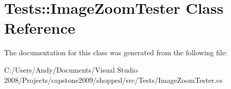 \hypertarget{class_tests_1_1_image_zoom_tester}{
\section{Tests::ImageZoomTester Class Reference}
\label{class_tests_1_1_image_zoom_tester}
}


The documentation for this class was generated from the following file:\begin{DoxyCompactItemize}
\item 
C:/Users/Andy/Documents/Visual Studio 2008/Projects/capstone2009/shopped/src/Tests/ImageZoomTester.cs\end{DoxyCompactItemize}
